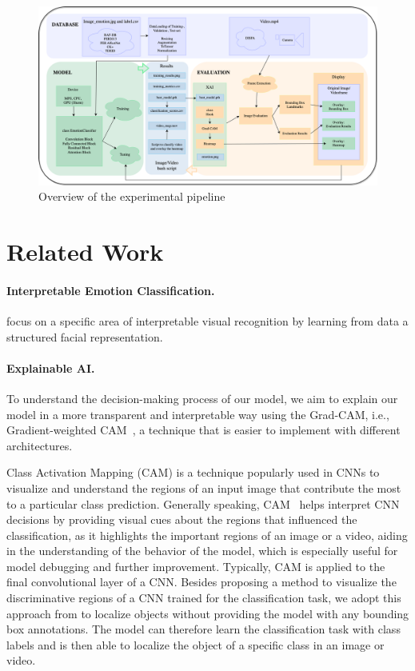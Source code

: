 \begin{figure}[ht]
  \centering
   \includegraphics[width=\linewidth]{pipeline.png}
   \caption{Overview of the experimental pipeline} 
   \label{fig:pipeline}
\end{figure}

\section{Related Work}
\label{sec:related}

\paragraph{Interpretable Emotion Classification.}

\citet{YinTLS019} focus on a specific area of interpretable visual recognition by learning from data a structured facial representation. 
\citet{Malik0R21} 

\paragraph{Explainable AI.}
To understand the decision-making process of our model, 
we aim to explain our model in a more transparent and interpretable way using the Grad-CAM, 
i.e., Gradient-weighted CAM~\cite{SelvarajuCDVPB17}, 
a technique that is easier to implement with different architectures. 

Class Activation Mapping (CAM) is a technique popularly used in CNNs to visualize and understand the regions of an input image that contribute the most to a particular class prediction. 
Generally speaking, 
CAM~\cite{ZhouKLOT16} helps interpret CNN decisions by providing visual cues about the regions that influenced the classification, 
as it highlights the important regions of an image or a video, 
aiding in the understanding of the behavior of the model, 
which is especially useful for model debugging and further improvement. 
Typically,
CAM is applied to the final convolutional layer of a CNN. 
Besides proposing a method to visualize the discriminative regions of a CNN trained for the classification task, 
we adopt this approach from \citet{ZhouKLOT16} to localize objects without providing the model with any bounding box annotations. 
The model can therefore learn the classification task with class labels and is then able to localize the object of a specific class in an image or video. 

